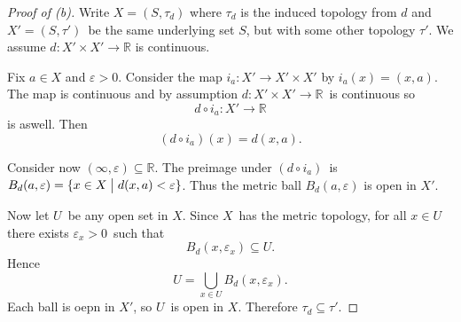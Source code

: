 \begin{proof}[Proof of (b)]
    Write $X = (S, \tau_d)$ where $\tau_d$ is the 
    induced topology from $d$ and $X' = (S,\tau')$ be 
    the same underlying set $S$, but with some other 
    topology $\tau'$. 
    We assume $d: X' \times X' \to \mathbb R$ is 
    continuous. 

    Fix $a \in X$ and $\varepsilon > 0$. Consider the map 
    $i_a : X' \to X' \times X'$ by $i_a(x) = (x,a)$. 
    The map is continuous and by assumption 
    $d : X' \times X' \to \mathbb R$ is continuous so 
    \[
        d \circ i_a : X' \to \mathbb R
    \]
    is aswell. 
    Then 
    \[
        (d\circ i_a)(x) = d(x,a). 
    \]

    Consider now $(\infty,\varepsilon) \subseteq \mathbb R$. 
    The preimage under $(d\circ i_a)$ is $B_d(a,\varepsilon) = 
    \{x \in X \bigm| d(x,a) < \varepsilon\}$. Thus the metric 
    ball $B_d(a,\varepsilon)$ is open in $X'$. 

    Now let $U$ be any open set in $X$. Since $X$ has the 
    metric topology, for all $x \in U$ there exists 
    $\varepsilon_x > 0$ such that 
    \[
        B_d(x,\varepsilon_x) \subseteq U.
    \]
    Hence 
    \[
        U = \bigcup_{x \in U}B_d(x,\varepsilon_x).
    \]
    Each ball is oepn in $X'$, so $U$ is open in $X$. 
    Therefore $\tau_d \subseteq \tau'$. 
\end{proof}


